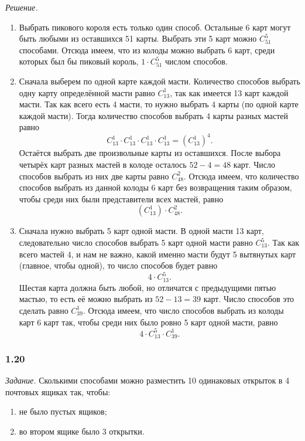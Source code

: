 \textit{Решение.}
\begin{enumerate}[label=\alph*)]
\item Выбрать пикового короля есть только один способ.
Остальные 6 карт могут быть любыми из оставшихся 51 карты.
Выбрать эти 5 карт можно $ C_{51}^5 $ способами.
Отсюда имеем, что из колоды можно выбрать 6 карт, среди которых был бы пиковый король, $ 1 \cdot C_{51}^5 $ числом способов.

\item Сначала выберем по одной карте каждой масти.
Количество способов выбрать одну карту определённой масти равно $C_{13}^1$, так как имеется 13 карт каждой масти.
Так как всего есть 4 масти, то нужно выбрать 4 карты (по одной карте каждой масти).
Тогда количество способов выбрать 4 карты разных мастей равно
$$ C_{13}^1 \cdot C_{13}^1 \cdot C_{13}^1 \cdot C_{13}^1 =
\left( C_{13}^1 \right)^4.$$
Остаётся выбрать две произвольные карты из оставшихся.
После выбора четырёх карт разных мастей в колоде осталось $ 52 - 4 = 48 $ карт.
Число способов выбрать из них две карты равно $ C_{48}^2 $.
Отсюда имеем, что количество способов выбрать из данной колоды 6 карт без возвращения таким образом, чтобы среди них были представители всех мастей, равно
$$ \left( C_{13}^1 \right) \cdot C_{48}^2.$$

\item Сначала нужно выбрать 5 карт одной масти.
В одной масти 13 карт, следовательно число способов выбрать 5 карт одной масти равно $ C_{13}^5 $.
Так как всего мастей 4, и нам не важно, какой именно масти будут 5 вытянутых карт (главное, чтобы одной), то число способов будет равно
$$ 4 \cdot C_{13}^5.$$
Шестая карта должна быть любой, но отличатся с предыдущими пятью мастью, то есть её можно выбрать из $ 52 - 13 = 39 $ карт.
Число способов это сделать равно $ C_{39}^1 $.
Отсюда имеем, что число способов выбрать из колоды карт 6 карт так, чтобы среди них было ровно 5 карт одной масти, равно
$$ 4 \cdot C_{13}^5 \cdot C_{39}^1.$$
\end{enumerate}

\subsubsection*{1.20}

\textit{Задание.} Сколькими способами можно разместить 10 одинаковых открыток в 4 почтовых ящиках так, чтобы:
\begin{enumerate}[label=\alph*)]
\item не было пустых ящиков;
\item во втором ящике было 3 открытки.
\end{enumerate}

